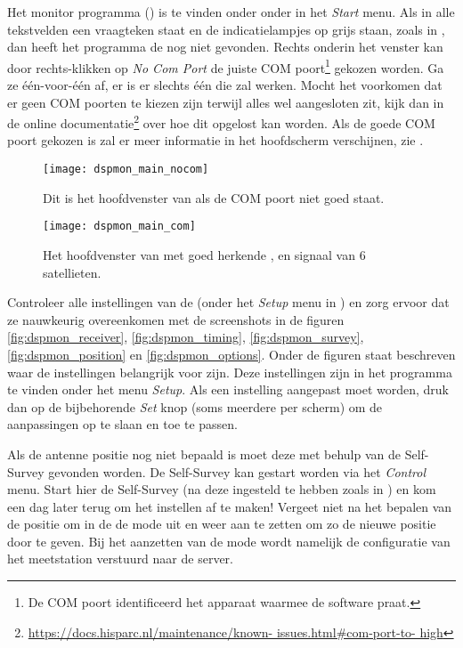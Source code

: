 Het \gps monitor programma (\dspmon) is te vinden onder onder \hisparc
in het \emph{Start} menu. Als in alle tekstvelden een vraagteken staat en de
indicatielampjes op grijs staan, zoals in
, dan heeft het programma de \gps nog niet
gevonden. Rechts onderin het venster kan door rechts-klikken op \emph{No
Com Port} de juiste COM poort\footnote{De COM poort identificeerd het
apparaat waarmee de software praat.} gekozen worden. Ga ze één-voor-één
af, er is er slechts één die zal werken. Mocht het voorkomen dat er geen
COM poorten te kiezen zijn terwijl alles wel aangesloten zit, kijk dan
in de online
documentatie\footnote{\url{https://docs.hisparc.nl/maintenance/known-
issues.html#com-port-to- high}} over hoe dit opgelost kan worden. Als de
goede COM poort gekozen is zal er meer informatie in het hoofdscherm
verschijnen, zie .

\begin{figure}
    \centering
    \texttt{[image: dspmon\_main\_nocom]}
    \caption{Dit is het hoofdvenster van \dspmon als de COM poort niet
    goed staat.}
    \label{fig:dspmon_main_nocom}
\end{figure}

\begin{figure}
    \centering
    \texttt{[image: dspmon\_main\_com]}
    \caption{Het hoofdvenster van \dspmon met goed herkende \gps, en
             signaal van 6 satellieten.}
    \label{fig:dspmon_main_com}
\end{figure}

Controleer alle instellingen van de \gps (onder het \emph{Setup} menu in
\dspmon) en zorg ervoor dat ze nauwkeurig overeenkomen met de
screenshots in de figuren \ref{fig:dspmon_receiver},
\ref{fig:dspmon_timing}, \ref{fig:dspmon_survey},
\ref{fig:dspmon_position} en \ref{fig:dspmon_options}. Onder de figuren
staat beschreven waar de instellingen belangrijk voor zijn. Deze
instellingen zijn in het programma te vinden onder het menu
\emph{Setup}. Als een instelling aangepast moet worden, druk dan op de
bijbehorende \emph{Set} knop (soms meerdere per scherm) om de
aanpassingen op te slaan en toe te passen.

Als de \gps antenne positie nog niet bepaald is moet deze met behulp van
de Self-Survey gevonden worden. De Self-Survey kan gestart worden via
het \emph{Control} menu. Start hier de Self-Survey (na deze ingesteld te hebben
zoals in ) en kom een dag later terug om het
instellen af te maken! Vergeet niet na het bepalen van de positie om in
de \hisparc \daq de \daq mode uit en weer aan te zetten om zo de nieuwe
positie door te geven. Bij het aanzetten van de \daq mode wordt namelijk
de configuratie van het meetstation verstuurd naar de server.

